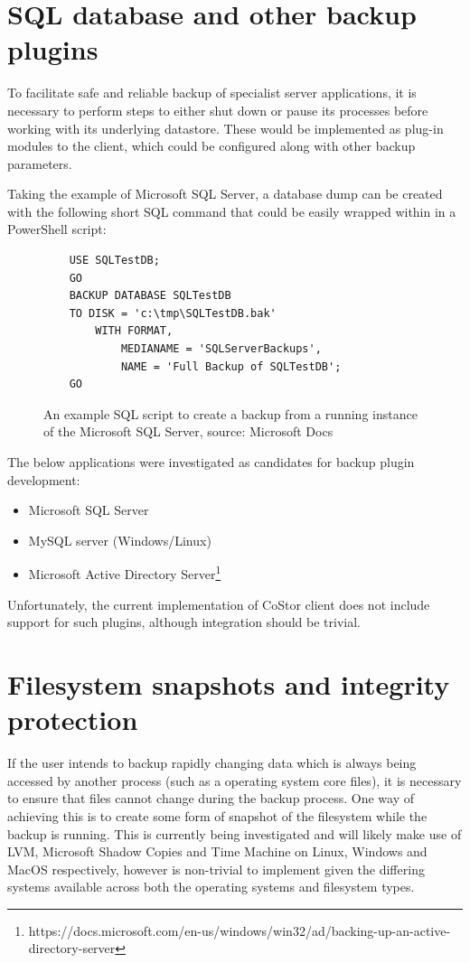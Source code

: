 \documentclass[bsc,frontabs,twoside,singlespacing,parskip,deptreport]{infthesis}     %
\begin{document}
\section{SQL database and other backup plugins}

To facilitate safe and reliable backup of specialist server applications, it is necessary to perform
steps to either shut down or pause its processes before working with its underlying datastore. 
These would be implemented as plug-in modules to the client, which could be configured along
with other backup parameters.

Taking the example of Microsoft SQL Server, a database dump can be created with the following 
short SQL command that could be easily wrapped within in a PowerShell script:

\begin{figure}[h]
	\begin{verbatim}
	USE SQLTestDB;
	GO
	BACKUP DATABASE SQLTestDB
	TO DISK = 'c:\tmp\SQLTestDB.bak'
   		WITH FORMAT,
      		MEDIANAME = 'SQLServerBackups',
      		NAME = 'Full Backup of SQLTestDB';
	GO
	\end{verbatim}
	\caption{An example SQL script to create a backup from a running instance of the Microsoft SQL Server, source: Microsoft Docs\cite{mssql}}
\end{figure}

The below applications were investigated as candidates for backup plugin development:

\begin{itemize}
	\item Microsoft SQL Server
	\item MySQL server (Windows/Linux)
	\item Microsoft Active Directory Server\footnote{https://docs.microsoft.com/en-us/windows/win32/ad/backing-up-an-active-directory-server}
\end{itemize}

Unfortunately, the current implementation of CoStor client does not include support for such plugins, 
although integration should be trivial.

\section{Filesystem snapshots and integrity protection}

If the user intends to backup rapidly changing data which is always being accessed by another 
process (such as a operating system core files), it is necessary to ensure that files 
cannot change during the backup process. One way of achieving this is to create some form
of snapshot of the filesystem while the backup is running. This is currently being investigated
and will likely make use of LVM, Microsoft Shadow Copies and Time Machine on Linux, Windows and
MacOS respectively, however is non-trivial to implement given the differing systems available across
both the operating systems and filesystem types.
\end{document}
